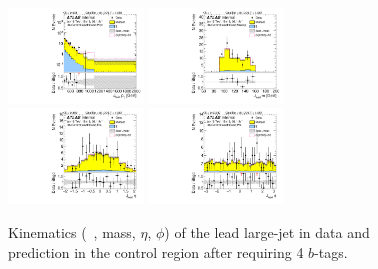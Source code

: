 \begin{figure}[htbp!]
\begin{center}
\includegraphics[width=0.32\textwidth,angle=-90]{figures/boosted/Control/b77_FourTag_Control_leadHCand_Pt_m_1.pdf}
\includegraphics[width=0.32\textwidth,angle=-90]{figures/boosted/Control/b77_FourTag_Control_leadHCand_Mass_s.pdf}\\
\includegraphics[width=0.32\textwidth,angle=-90]{figures/boosted/Control/b77_FourTag_Control_leadHCand_Eta.pdf}
\includegraphics[width=0.32\textwidth,angle=-90]{figures/boosted/Control/b77_FourTag_Control_leadHCand_Phi.pdf}
  \caption{Kinematics (\pt~, mass, $\eta$, $\phi$) of the lead large-\R jet in data and prediction in the control region after requiring 4 $b$-tags. }
  \label{fig:boosted-4b-control-ak10-lead}
\end{center}
\end{figure}

